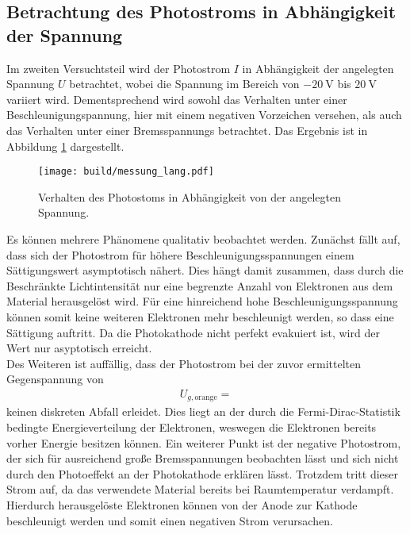 \subsection{Betrachtung des Photostroms in Abhängigkeit der Spannung}
Im zweiten Versuchtsteil wird der Photostrom $I$ in Abhängigkeit der angelegten Spannung $U$ betrachtet, wobei die Spannung im Bereich von $\SI{-20}{\volt}$ bis $\SI{20}{\volt}$ variiert wird.
Dementsprechend wird sowohl das Verhalten unter einer Beschleunigungspannung, hier mit einem negativen Vorzeichen versehen, als auch das Verhalten unter einer Bremsspannungs betrachtet.
Das Ergebnis ist in Abbildung \ref{plot:7} dargestellt.
\begin{figure}
  \centering
  \texttt{[image: build/messung\_lang.pdf]}
  \caption{Verhalten des Photostoms in Abhängigkeit von der angelegten Spannung.}
  \label{plot:7}
\end{figure}
Es können mehrere Phänomene qualitativ beobachtet werden.
Zunächst fällt auf, dass sich der Photostrom für höhere Beschleunigungsspannungen einem Sättigungswert asymptotisch nähert.
Dies hängt damit zusammen, dass durch die Beschränkte Lichtintensität nur eine begrenzte Anzahl von Elektronen aus dem Material herausgelöst wird.
Für eine hinreichend hohe Beschleunigungsspannung können somit keine weiteren Elektronen mehr beschleunigt werden, so dass eine Sättigung auftritt. %
Da die Photokathode nicht perfekt evakuiert ist, wird der Wert nur asyptotisch erreicht.\\
Des Weiteren ist auffällig, dass der Photostrom bei der zuvor ermittelten Gegenspannung von
\begin{align*}
  U_{g, \text{orange}} = 
\end{align*}
keinen diskreten Abfall erleidet.
Dies liegt an der durch die Fermi-Dirac-Statistik bedingte Energieverteilung der Elektronen, weswegen die Elektronen bereits vorher Energie besitzen können.
Ein weiterer Punkt ist der negative Photostrom, der sich für ausreichend große Bremsspannungen beobachten lässt und sich nicht durch den Photoeffekt an der Photokathode erklären lässt.
Trotzdem tritt dieser Strom auf, da das verwendete Material bereits bei Raumtemperatur verdampft.
Hierdurch herausgelöste Elektronen können von der Anode zur Kathode beschleunigt werden und somit einen negativen Strom verursachen.
